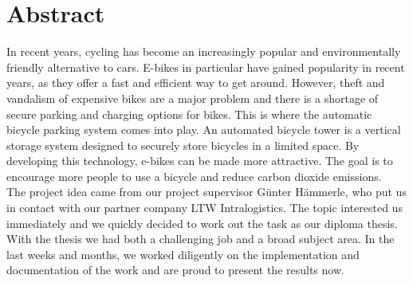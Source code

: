 \section*{Abstract}
In recent years, cycling has become an increasingly popular and environmentally friendly alternative to cars. E-bikes in particular have gained popularity in recent years, as they offer a fast and efficient way to get around. However, theft and vandalism of expensive bikes are a major problem and there is a shortage of secure parking and charging options for bikes. This is where the automatic bicycle parking system comes into play. An automated bicycle tower is a vertical storage system designed to securely store bicycles in a limited space. By developing this technology, e-bikes can be made more attractive. The goal is to encourage more people to use a bicycle and reduce carbon dioxide emissions.\\
The project idea came from our project supervisor Günter Hämmerle, who put us in contact with our partner company LTW Intralogistics. The topic interested us immediately and we quickly decided to work out the task as our diploma thesis.\\
With the thesis we had both a challenging job and a broad subject area. In the last weeks and months, we worked diligently on the implementation and documentation of the work and are proud to present the results now.\\

